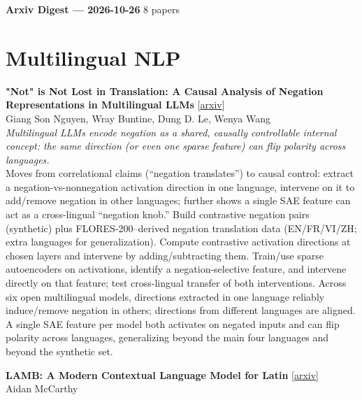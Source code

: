 \documentclass[12pt,letterpaper]{article}
\begin{document}
{\footnotesize\textbf{Arxiv Digest --- 2026-10-26} \hfill 8 papers}

\smallskip

\section*{Multilingual NLP}

{\small\textbf{"Not" is Not Lost in Translation: A Causal Analysis of Negation Representations in Multilingual LLMs}} {\scriptsize[\href{https://arxiv.org/abs/2610.32281}{arxiv}]}\\
{\scriptsize Giang Son Nguyen, Wray Buntine, Dung D. Le, Wenya Wang}\\

{\small\textit{Multilingual LLMs encode negation as a shared, causally controllable internal concept: the same direction (or even one sparse feature) can flip polarity across languages.}}\\[1pt]
{\footnotesize Moves from correlational claims (``negation translates'') to causal control: extract a negation-vs-nonnegation activation direction in one language, intervene on it to add/remove negation in other languages; further shows a single SAE feature can act as a cross-lingual ``negation knob.'' Build contrastive negation pairs (synthetic) plus FLORES-200--derived negation translation data (EN/FR/VI/ZH; extra languages for generalization). Compute contrastive activation directions at chosen layers and intervene by adding/subtracting them. Train/use sparse autoencoders on activations, identify a negation-selective feature, and intervene directly on that feature; test cross-lingual transfer of both interventions. Across six open multilingual models, directions extracted in one language reliably induce/remove negation in others; directions from different languages are aligned. A single SAE feature per model both activates on negated inputs and can flip polarity across languages, generalizing beyond the main four languages and beyond the synthetic set.}

\medskip

{\small\textbf{LAMB: A Modern Contextual Language Model for Latin}} {\scriptsize[\href{https://arxiv.org/abs/2610.31723}{arxiv}]}\\
{\scriptsize Aidan McCarthy}\\
\end{document}
